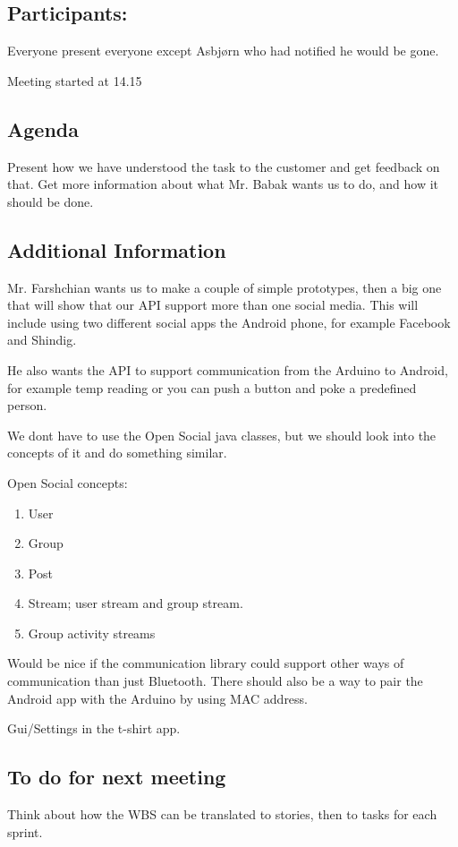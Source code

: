 \subsection{Participants:}
Everyone present everyone except Asbjørn who had notified he would be gone.

Meeting started at 14.15

\subsection{Agenda}
Present how we have understood the task to the customer and get feedback on that.
Get more information about what Mr. Babak wants us to do, and how it should be done.

\subsection{Additional Information}
Mr. Farshchian wants us to make a couple of simple prototypes, then a big one that will show that our API support more than one social media. This will include using two different social apps the Android phone, for example Facebook and Shindig.

He also wants the API to support communication from the Arduino to Android, for example temp reading or you can push a button and poke a predefined person.

We dont have to use the Open Social java classes, but we should look into the concepts of it and do something similar.

Open Social concepts:
\begin{enumerate}
\item  User
\item Group
\item  Post
\item Stream; user stream and group stream.
\item Group activity streams
\end{enumerate}

Would be nice if the communication library could support other ways of communication than just Bluetooth. There should also be a way to pair the Android app with the Arduino by using MAC address.


Gui/Settings in the t-shirt app.


\subsection{To do for next meeting}
Think about how the WBS can be translated to stories, then to tasks for each sprint.

